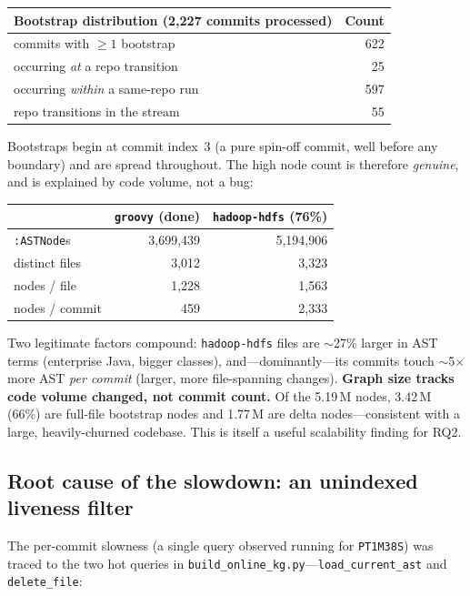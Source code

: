 \documentclass[11pt]{article}
\newcommand{\code}[1]{\texttt{#1}}
\begin{document}
\begin{center}
\begin{tabular}{@{}lr@{}}
\toprule
Bootstrap distribution (2{,}227 commits processed) & Count \\
\midrule
commits with $\geq 1$ bootstrap                 & 622 \\
\quad occurring \emph{at} a repo transition     & 25 \\
\quad occurring \emph{within} a same-repo run   & 597 \\
repo transitions in the stream                  & 55 \\
\bottomrule
\end{tabular}
\end{center}

Bootstraps begin at commit index~3 (a pure spin-off commit, well before any
boundary) and are spread throughout. The high node count is therefore
\emph{genuine}, and is explained by code volume, not a bug:

\begin{center}
\begin{tabular}{@{}lrr@{}}
\toprule
 & \code{groovy} (done) & \code{hadoop-hdfs} (76\%) \\
\midrule
\code{:ASTNode}s            & 3{,}699{,}439 & 5{,}194{,}906 \\
distinct files              & 3{,}012       & 3{,}323 \\
nodes / file                & 1{,}228       & 1{,}563 \\
nodes / commit              & 459           & 2{,}333 \\
\bottomrule
\end{tabular}
\end{center}

Two legitimate factors compound: \code{hadoop-hdfs} files are $\sim$27\% larger
in AST terms (enterprise Java, bigger classes), and---dominantly---its commits
touch $\sim$5$\times$ more AST \emph{per commit} (larger, more file-spanning
changes). \textbf{Graph size tracks code volume changed, not commit count.} Of
the 5.19\,M nodes, 3.42\,M (66\%) are full-file bootstrap nodes and 1.77\,M are
delta nodes---consistent with a large, heavily-churned codebase. This is itself a
useful scalability finding for RQ2.

\subsection{Root cause of the slowdown: an unindexed liveness filter}
The per-commit slowness (a single query observed running for
\code{PT1M38S}) was traced to the two hot queries in
\code{build\_online\_kg.py}---\code{load\_current\_ast} and \code{delete\_file}:
\end{document}
